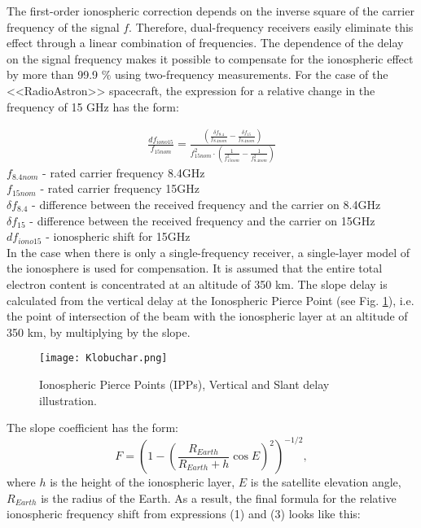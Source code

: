 \documentclass[a4paper,english,bopenany]{article}
\begin{document}
The first-order ionospheric correction depends on the inverse square of the carrier frequency of the signal $ f $. Therefore, dual-frequency receivers easily eliminate this effect through a linear combination of frequencies. The dependence of the delay on the signal frequency makes it possible to compensate for the ionospheric effect by more than 99.9 $\%$ using two-frequency measurements. For the case of the <<RadioAstron>> spacecraft, the expression for a relative change in the frequency of 15 GHz has the form:

 \begin{eqnarray}\label{2freqComb}
\frac{df_{iono15}}{f_{15nom}} =\frac{ \left( \frac{\delta f_{8.4}}{f_{8.4nom}} - \frac{\delta f_{15}}{f_{8.4nom}} \right)}{f_{15nom}^{2}\cdot\left( \frac{1}{f_{15nom}^{2}} - \frac{1}{f_{8.4nom}^{2}}\right)}  
\end{eqnarray}
$f_{8.4nom}$ - rated carrier frequency 8.4GHz\\
$f_{15nom}$ - rated carrier frequency 15GHz\\
$\delta f_{8.4}$ - difference between the received frequency and the carrier on 8.4GHz\\
$\delta f_{15}$ - difference between the received frequency and the carrier on 15GHz\\
$df_{iono15}$ - ionospheric shift for 15GHz \\


In the case when there is only a single-frequency receiver, a single-layer model of the ionosphere is used for compensation. It is assumed that the entire total electron content is concentrated at an altitude of 350 km. The slope delay is calculated from the vertical delay at the Ionospheric Pierce Point (see Fig. \ref{fig:IPP}), i.e. the point of intersection of the beam with the ionospheric layer at an altitude of 350 km, by multiplying by the slope.




\begin{figure}[ht!]
	\centering
	\texttt{[image: Klobuchar.png]}
	\caption{Ionospheric Pierce Points (IPPs), Vertical and Slant delay illustration. }
	\label{fig:IPP}
\end{figure}


The slope coefficient has the form:
$$F = \left( 1 - \left( \frac{R_{Earth}}{R_{Earth}+h}\cos E\right) ^{2}\right)^{-1/2}, $$
where $h$ is the height of the ionospheric layer, $ E $ is the satellite elevation angle, $ R_ {Earth} $ is the radius of the Earth. As a result, the final formula for the relative ionospheric frequency shift from expressions (1) and (3) looks like this:
\end{document}
